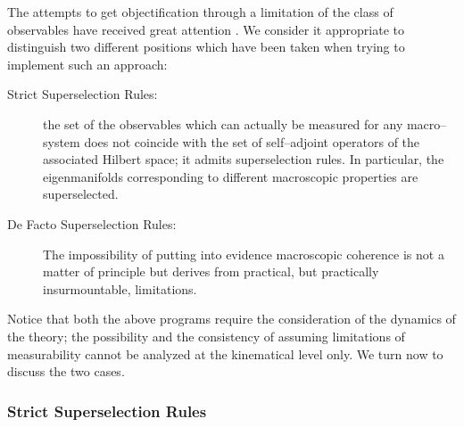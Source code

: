 \documentclass[10pt,a4paper]{article}
\begin{document}
The attempts to get objectification through a limitation of the
class of observables have received great attention
\cite{ja,dlp,got,zur1,zu,jz}. We consider it appropriate to
distinguish two different positions which have been taken when
trying to implement such an approach:
\begin{description}
\item[Strict Superselection Rules:] the set of the observables
which can actually be measured for any macro--system does not
coincide with the set of self--adjoint operators of the associated
Hilbert space; it admits superselection rules. In particular, the
eigenmanifolds corresponding to different macroscopic properties
are superselected.
\item[De Facto Superselection Rules:] The impossibility of putting
into evidence macroscopic coherence is not a matter of principle
but derives from practical, but practically insurmountable,
limitations.
\end{description}
Notice that both the above programs require the consideration of
the dynamics of the theory; the possibility and the consistency of
assuming limitations of measurability cannot be analyzed at the
kinematical level only. We turn now to discuss the two cases.


\subsubsection{Strict Superselection Rules} \label{sec331}
\end{document}
